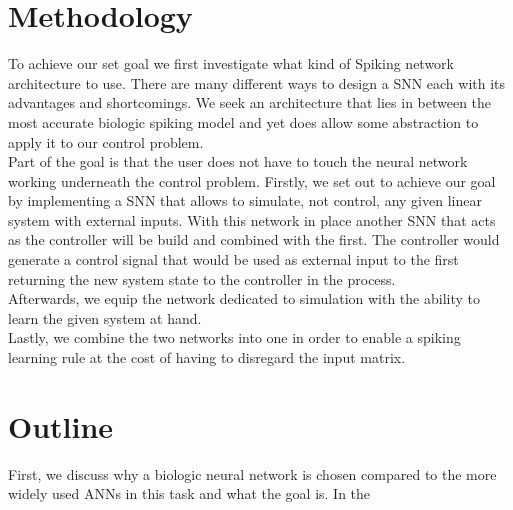 \section{Methodology}
To achieve our set goal we first investigate what kind of Spiking network architecture to use. There are many different ways to design a \ac{SNN} each with its advantages and shortcomings.
We seek an architecture that lies in between the most accurate biologic spiking model and yet does allow some abstraction to apply it to our control problem.\\
Part of the goal is that the user does not have to touch the neural network working underneath the control problem.
Firstly, we set out to achieve our goal by implementing a \ac{SNN} that allows to simulate, not control, any given linear system with  external inputs. With this network in place another \ac{SNN} that acts as the controller will be build and combined with the first. The controller would generate a control signal that would be used as external input to the first returning the new system state to the controller in the process.\\
Afterwards, we equip the network dedicated to simulation with the ability to learn the given system at hand.\\
Lastly, we combine the two networks into one in order to enable a spiking learning rule at the cost of having to disregard the input matrix.\\

\section{Outline}
First, we discuss why a biologic neural network is chosen compared to the more widely used \acp{ANN} in this task and what the goal is. In the